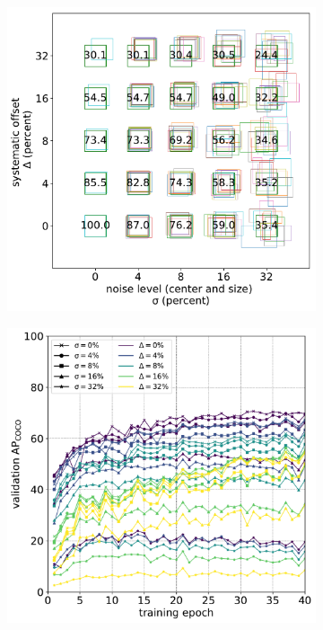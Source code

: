 \documentclass[conference]{IEEEtran}
\begin{document}
\begin{figure}[ht]
\centering
\begin{subfigure}[t]{0.5\linewidth}
  \includegraphics[width=1.0\linewidth]{figures/noisy_boxes.pdf}
  \caption{}
\end{subfigure}%
\begin{subfigure}[t]{0.5\linewidth}
  \includegraphics[width=1.0\linewidth]{figures/noise_training.pdf}

\end{subfigure}
\end{figure}
\end{document}
